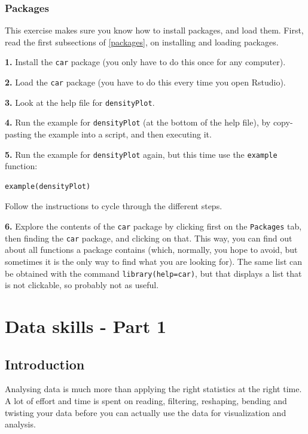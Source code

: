 \documentclass[]{book}
\begin{document}
\hypertarget{packages-1}{%
\subsection{Packages}\label{packages-1}}

This exercise makes sure you know how to install packages, and load them. First, read the first subsections of \ref{packages}, on installing and loading packages.

\textbf{1.} Install the \texttt{car} package (you only have to do this once for any computer).

\textbf{2.} Load the \texttt{car} package (you have to do this every time you open Rstudio).

\textbf{3.} Look at the help file for \texttt{densityPlot}.

\textbf{4.} Run the example for \texttt{densityPlot} (at the bottom of the help file), by copy-pasting the example into a script, and then executing it.

\textbf{5.} Run the example for \texttt{densityPlot} again, but this time use the \texttt{example} function:

\begin{verbatim}
example(densityPlot)
\end{verbatim}

Follow the instructions to cycle through the different steps.

\textbf{6.} Explore the contents of the \texttt{car} package by clicking first on the \texttt{Packages} tab, then finding the \texttt{car} package, and clicking on that. This way, you can find out about all functions a package contains (which, normally, you hope to avoid, but sometimes it is the only way to find what you are looking for). The same list can be obtained with the command \texttt{library(help=car)}, but that displays a list that is not clickable, so probably not as useful.

\hypertarget{dataskills1}{%
\chapter{Data skills - Part 1}\label{dataskills1}}

\hypertarget{introduction}{%
\section{Introduction}\label{introduction}}

Analysing data is much more than applying the right statistics at the right time. A lot of effort and time is spent on reading, filtering, reshaping, bending and twisting your data before you can actually use the data for visualization and analysis.
\end{document}
